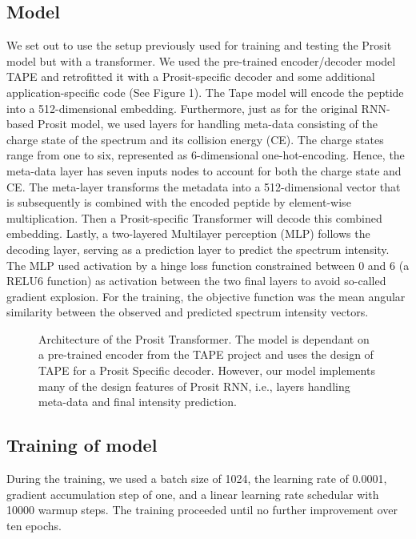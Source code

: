 \documentclass[10pt,a4paper]{article}
\begin{document}
\subsection*{Model}
We set out to use the setup previously used for training and testing the Prosit model but with a transformer. We used the pre-trained encoder/decoder model TAPE \cite{Rao2019-qq} and retrofitted it with a Prosit-specific decoder and some additional application-specific code (See Figure 1). The Tape model will encode the peptide into a 512-dimensional embedding. Furthermore, just as for the original RNN-based Prosit model, we used layers for handling meta-data consisting of the charge state of the spectrum and its collision energy (CE). The charge states range from one to six, represented as 6-dimensional one-hot-encoding. Hence, the meta-data layer has seven inputs nodes to account for both the charge state and CE. The meta-layer transforms the metadata into a 512-dimensional vector that is subsequently is combined with the encoded peptide by element-wise multiplication. Then a Prosit-specific Transformer will decode this combined embedding. Lastly, a two-layered Multilayer perception (MLP) follows the decoding layer, serving as a prediction layer to predict the spectrum intensity. The MLP used activation by a hinge loss function constrained between 0 and 6 (a RELU6 function) as activation between the two final layers to avoid so-called gradient explosion. For the training, the objective function was the mean angular similarity between the observed and predicted spectrum intensity vectors.


\begin{figure}[htb]
\caption{Architecture of the Prosit Transformer. The model is dependant on a pre-trained encoder from the TAPE project and uses the design of TAPE for a Prosit Specific decoder. However, our model implements many of the design features of Prosit RNN, i.e., layers handling meta-data and final intensity prediction.}
\end{figure}


\subsection*{Training of model}

During the training, we used a batch size of 1024, the learning rate of 0.0001, gradient accumulation step of one, and a linear learning rate schedular with 10000 warmup steps. The training proceeded until no further improvement over ten epochs.
\end{document}
